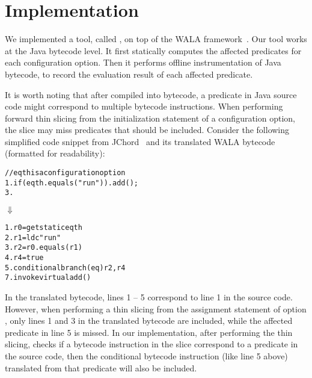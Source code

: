 \section{Implementation}
\label{sec:implementation}

We implemented a tool, called \ourtool, on top of the WALA
framework~\cite{wala}. Our tool works at the Java bytecode level.
It first statically computes the affected predicates
for each configuration option. Then it performs offline instrumentation
of Java bytecode, to record the evaluation result of each affected
predicate. 

It is worth noting that after compiled into bytecode,
a predicate in Java source code might correspond to multiple bytecode
instructions. When performing forward thin slicing from
the initialization statement of a configuration option,
the slice may miss predicates that should be included.
Consider the following simplified code snippet from JChord~\cite{jchord}
and its translated WALA bytecode (formatted for readability): 


\begin{CodeOut}
\begin{alltt}
   // eqth is a configuration option
1. if (eqth.equals("run")) .   add();
3. \ttrcb
\end{alltt}
\end{CodeOut}
\vspace{-2mm}
\hspace{20mm}$\Downarrow$ 
\begin{CodeOut}
\begin{alltt}
1. r0 = getstatic eqth
2. r1 = ldc "run"
3. r2 = r0.equals(r1)
4. r4 = true
5. conditional branch(eq) r2, r4
7. invokevirtual add() 
\end{alltt}
\end{CodeOut}

In the translated bytecode, lines 1 -- 5 correspond to line 1 in the
source code. However, when performing a thin slicing from the
assignment statement of option , only lines 1 and 3
in the translated bytecode are included, while the affected predicate
in line 5 is missed.  In our implementation, after performing the thin
slicing, \ourtool checks if a bytecode instruction in the slice
correspond to a predicate in the source code, then the
conditional bytecode instruction (like line 5 above) translated from that predicate
will also be included.

